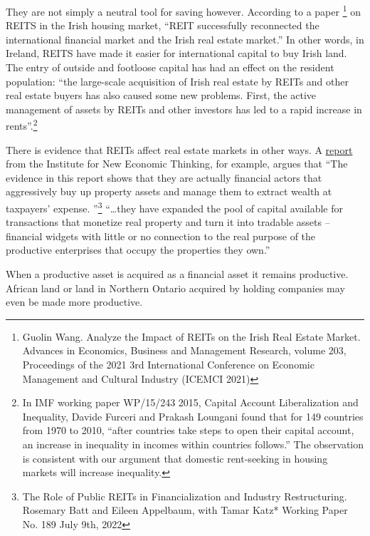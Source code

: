 They are not simply a neutral tool for saving however. According to a paper \cite{wangAnalyzeImpactREITs2021}\footnote{Guolin Wang. Analyze the Impact of REITs on the Irish Real Estate Market. Advances in Economics, Business and Management Research, volume 203, Proceedings of the 2021 3rd International Conference on Economic Management and Cultural Industry (ICEMCI 2021)} on REITS in the Irish housing market, ``REIT successfully reconnected the international financial market and the Irish real estate market.'' In other words, in Ireland, REITS have made it easier for international capital to buy Irish land. The entry of outside and footloose capital has had an effect on the resident population:  ``the large-scale acquisition of Irish real estate by REITs and other real estate buyers has also caused some new problems. First, the active management of assets by REITs and other investors has led to a rapid increase in rents''.\footnote{In IMF working paper WP/15/243 2015, Capital Account Liberalization and Inequality, Davide Furceri and Prakash Loungani found that for 149 countries from 1970 to 2010, ``after countries take steps to open their capital account, an increase in inequality in incomes within countries follows.'' The observation is consistent with our argument  that domestic rent-seeking in housing markets will increase inequality.}   \cite{furceriCapitalAccountLiberalization2015}

There is evidence that REITs affect real estate markets in other ways. A \href{https://www.ineteconomics.org/research/research-papers/the-role-of-public-reits-in-financialization-and-industry-restructuring}{report} from the Institute for New Economic Thinking, for example, argues that ``The evidence in this report shows that they are actually financial actors that aggressively buy up property assets and manage them to extract wealth at taxpayers’ expense. ''\footnote{The Role of Public REITs in Financialization and Industry Restructuring. Rosemary Batt and Eileen Appelbaum, with Tamar Katz* Working Paper No. 189 July 9th, 2022} ``\dots they have expanded the pool of capital available for transactions that monetize real property and turn it into tradable assets – financial widgets with little or no connection to the real purpose of the productive enterprises that occupy the properties they own.''



When  a productive asset is acquired as a financial asset it remains productive. African land or land in Northern Ontario acquired by holding companies may even be made more productive. 


